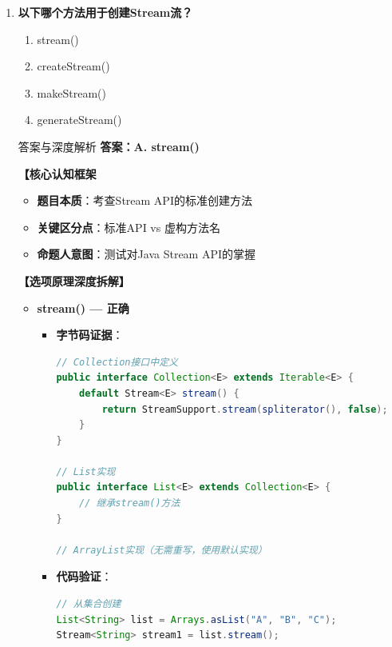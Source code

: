 \documentclass[12pt, a4paper]{ctexart}
\begin{document}
\begin{enumerate}[label=\textbf{\arabic*.}]
\begin{bluebox}{答案与深度解析}
		      \textbf{【命题趋势与实战策略】}

		      \textbf{考场秒杀}：看到Stream"不能"→必错，Stream功能很强大
	      \end{bluebox}

	      \vspace{1em}

	\item \textbf{以下哪个方法用于创建Stream流？}
	      \begin{enumerate}[label=\Alph*.]
		      \item stream()
		      \item createStream()
		      \item makeStream()
		      \item generateStream()
	      \end{enumerate}

	      \begin{bluebox}{答案与深度解析}
		      \textbf{答案：A. stream()}

		      \textbf{【核心认知框架}
		      \begin{itemize}[label={}, leftmargin=*, nosep]
			      \item \textbf{题目本质}：考查Stream API的标准创建方法
			      \item \textbf{关键区分点}：标准API vs 虚构方法名
			      \item \textbf{命题人意图}：测试对Java Stream API的掌握
		      \end{itemize}

		      \textbf{【选项原理深度拆解】}

		      \begin{itemize}[leftmargin=*, nosep, label={}]
			      \item[A] \textbf{stream() — 正确}
			            \begin{itemize}[label={}, leftmargin=*, nosep]
				            \item \textbf{字节码证据}：
				                  \begin{lstlisting}[language=Java]
// Collection接口中定义
public interface Collection<E> extends Iterable<E> {
    default Stream<E> stream() {
        return StreamSupport.stream(spliterator(), false);
    }
}

// List实现
public interface List<E> extends Collection<E> {
    // 继承stream()方法
}

// ArrayList实现（无需重写，使用默认实现）
				      \end{lstlisting}
				            \item \textbf{代码验证}：
				                  \begin{lstlisting}[language=Java]
// 从集合创建
List<String> list = Arrays.asList("A", "B", "C");
Stream<String> stream1 = list.stream();


\end{lstlisting}
\end{itemize}
\end{itemize}
\end{bluebox}
\end{enumerate}
\end{document}
